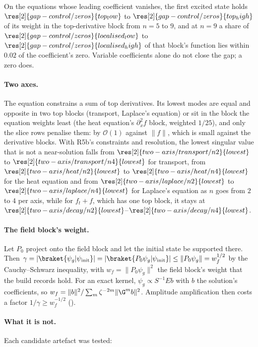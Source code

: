 On the equations whose leading coefficient vanishes, the first excited state holds $\res[2]{gap-control/zeros}{top_low}$ to $\res[2]{gap-control/zeros}{top_high}$ of its weight in the top-derivative block from $n=5$ to $9$, and at $n=9$ a share of $\res[2]{gap-control/zeros}{localised_low}$ to $\res[2]{gap-control/zeros}{localised_high}$ of that block's function lies within $0.02$ of the coefficient's zero. Variable coefficients alone do not close the gap; a zero does.

\paragraph{Two axes.} The equation constrains a sum of top derivatives. Its lowest modes are equal and opposite in two top blocks (transport, Laplace's equation) or sit in the block the equation weights least (the heat equation's $\partial_x^2f$ block, weighted $1/25$), and only the slice rows penalise them: by $\mathcal{O}(1)$ against $\|f\|$, which is small against the derivative blocks. With R5b's constraints and resolution, the lowest singular value that is not a near-solution falls from $\res[2]{two-axis/transport/n2}{lowest}$ to $\res[2]{two-axis/transport/n4}{lowest}$ for transport, from $\res[2]{two-axis/heat/n2}{lowest}$ to $\res[2]{two-axis/heat/n4}{lowest}$ for the heat equation and from $\res[2]{two-axis/laplace/n2}{lowest}$ to $\res[2]{two-axis/laplace/n4}{lowest}$ for Laplace's equation as $n$ goes from $2$ to $4$ per axis, while for $f_t+f$, which has one top block, it stays at $\res[2]{two-axis/decay/n2}{lowest}$--$\res[2]{two-axis/decay/n4}{lowest}$.

\paragraph{The field block's weight.} Let $P_0$ project onto the field block and let the initial state be supported there. Then $\gamma=|\braket{\psi_g|\psi_{\mathrm{init}}}|=|\braket{P_0\psi_g|\psi_{\mathrm{init}}}|\le\|P_0\psi_g\|=w_f^{1/2}$ by the Cauchy--Schwarz inequality, with $w_f=\|P_0\psi_g\|^2$ the field block's weight that the build records hold. For an exact kernel, $\psi_g\propto S^{-1}Eb$ with $b$ the solution's coefficients, so $w_f=\|b\|^2/\sum_m\zeta^{-2m}\|\G^mb\|^2$. Amplitude amplification then costs a factor $1/\gamma\ge w_f^{-1/2}$ ().

\paragraph{What it is not.} Each candidate artefact was tested:

